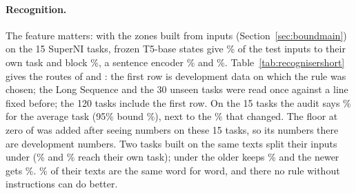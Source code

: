 \paragraph{Recognition.} The feature matters: with the zones built from inputs
(Section~\ref{sec:boundmain}) on the 15 SuperNI tasks, frozen
T5-base states give \AudZoneFrozenTOwn{}\% of the test inputs to their own task and block
\AudZoneFrozenTBlocked{}\%, a sentence encoder \AudZoneSentenceOwn{}\% and \AudZoneSentenceBlocked{}\%.
Table~\ref{tab:recognisershort} gives the routes of \recog{} and \handicap{}: the
first row is development data on which the rule was chosen; the Long Sequence and the 30 unseen
tasks were read once against a line fixed before; the 120 tasks include the first row.
On the 15 tasks the audit says \AudDevLLamOneAuditEst{}\% for the average task
(95\% bound \AudDevLLamOneAuditBound{}\%), next to the \AudDevLLamOneChanged{}\% that changed. The floor at zero of \handicap{} was added after seeing numbers on
these 15 tasks, so its numbers there are development numbers. Two
tasks built on the same texts split their inputs under \recog{} (\AudScalePairOlderLEnd{}\% and
\AudScalePairNewerLEnd{}\% reach their own task); under \handicap{} the older keeps
\AudScalePairOlderHEnd{}\% and the newer gets \AudScalePairNewerHEnd{}\%. \AudConfPairShare{}\% of
their texts are the same word for word, and there no rule without instructions can do better.

\begin{table}[t]
  \caption{Routes of \recog{} and \handicap{} (\%, means over tasks): test inputs at their own task after their task arrived and after the last task; routes changed; the audit's 95\% bound. Routes only; the first row is development data.}
  \label{tab:recognisershort}
  \centering
  
\end{table}

